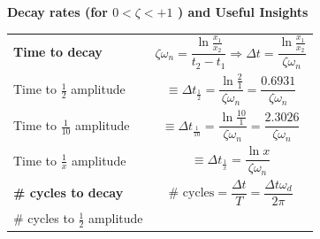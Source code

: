 \documentclass[
]{book}
\begin{document}
\textbf{Decay rates (for \(0 \lt \zeta \lt +1\) ) and Useful Insights}

\begin{longtable}[]{@{}ll@{}}
\toprule
\endhead
\begin{minipage}[t]{0.24\columnwidth}\raggedright
\textbf{Time to decay}\strut
\end{minipage} & \begin{minipage}[t]{0.71\columnwidth}\raggedright
\[\zeta \omega_n = \frac{\ln \frac{x_1}{x_2} }{t_2 - t_1} \Rightarrow \Delta t = \frac{\ln \frac{x_1}{x_2}}{\zeta \omega_n} \]\strut
\end{minipage}\tabularnewline
\begin{minipage}[t]{0.24\columnwidth}\raggedright
Time to \(\frac{1}{2}\) amplitude\strut
\end{minipage} & \begin{minipage}[t]{0.71\columnwidth}\raggedright
\[ \equiv \Delta t_{\frac{1}{2}} = \frac{\ln \frac{2}{1}}{\zeta \omega_n} = \frac{0.6931}{\zeta \omega_n}  \]\strut
\end{minipage}\tabularnewline
\begin{minipage}[t]{0.24\columnwidth}\raggedright
Time to \(\frac{1}{10}\) amplitude\strut
\end{minipage} & \begin{minipage}[t]{0.71\columnwidth}\raggedright
\[ \equiv \Delta t_{\frac{1}{10}} = \frac{\ln \frac{10}{1}}{\zeta \omega_n} = \frac{2.3026}{\zeta \omega_n}  \]\strut
\end{minipage}\tabularnewline
\begin{minipage}[t]{0.24\columnwidth}\raggedright
Time to \(\frac{1}{x}\) amplitude\strut
\end{minipage} & \begin{minipage}[t]{0.71\columnwidth}\raggedright
\[ \equiv \Delta t_{\frac{1}{x}} = \frac{\ln x }{\zeta \omega_n}  \]\strut
\end{minipage}\tabularnewline
\begin{minipage}[t]{0.24\columnwidth}\raggedright
\textbf{\# cycles to decay}\strut
\end{minipage} & \begin{minipage}[t]{0.71\columnwidth}\raggedright
\[\text{# cycles} = \frac{\Delta t }{T} = \frac{\Delta t \omega_d}{2 \pi} \]\strut
\end{minipage}\tabularnewline
\begin{minipage}[t]{0.24\columnwidth}\raggedright
\# cycles to \(\frac{1}{2}\) amplitude\strut
\end{minipage} & \begin{minipage}[t]{0.71\columnwidth}\raggedright

\end{minipage}
\end{longtable}
\end{document}
